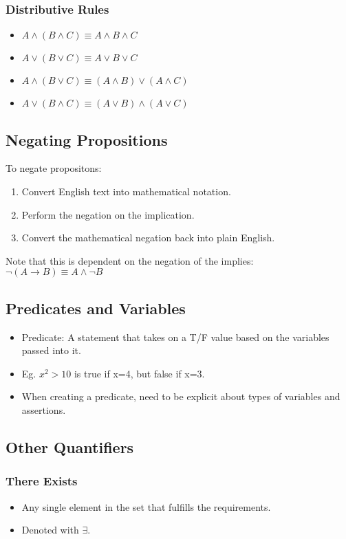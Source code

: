 \subsubsection{Distributive Rules}
\begin{itemize}
    \item $A \land (B \land C) \equiv A \land B \land C $
    \item $A \lor (B \lor C) \equiv A \lor B \lor C $
    \item $A \land (B \lor C) \equiv (A \land B) \lor (A \land C) $
    \item $A \lor (B \land C) \equiv (A \lor B) \land (A \lor C) $
\end{itemize}

\subsection{Negating Propositions}
To negate propositons:
\begin{enumerate}
    \item Convert English text into mathematical notation.
    \item Perform the negation on the implication.
    \item Convert the mathematical negation back into plain English.
\end{enumerate}
Note that this is dependent on the negation of the implies: $\neg(A \rightarrow B) \equiv A \land \neg B$

\subsection{Predicates and Variables}
\begin{itemize}
    \item Predicate: A statement that takes on a T/F value based on the variables passed into it.
    \item Eg. $x^2>10$ is true if x=4, but false if x=3.
    \item When creating a predicate, need to be explicit about types of variables and assertions.
\end{itemize}
\subsection{Other Quantifiers}
\subsubsection{There Exists}
\begin{itemize}
    \item Any single element in the set that fulfills the requirements.
    \item Denoted with $\exists$.
\end{itemize}
